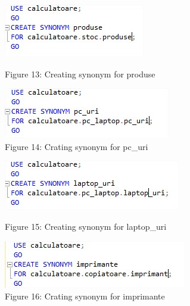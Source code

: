 \begin{figure}[H]
	\centering
		\includegraphics[width=\linewidth]{screens/17.jpg}
		\caption*{Figure 13: Creating synonym for produse}
		\label{}
	\endminipage\hfill
		\includegraphics[width=\linewidth]{screens/18.jpg}
		\caption*{Figure 14: Crating synonym for pc\_uri}
	\endminipage
\end{figure}

\begin{figure}[H]
	\centering
		\includegraphics[width=\linewidth]{screens/19.jpg}
		\caption*{Figure 15: Creating synonym for laptop\_uri}
		\label{}
	\endminipage\hfill
		\includegraphics[width=\linewidth]{screens/20.jpg}
		\caption*{Figure 16: Crating synonym for imprimante}
	\endminipage
\end{figure}

